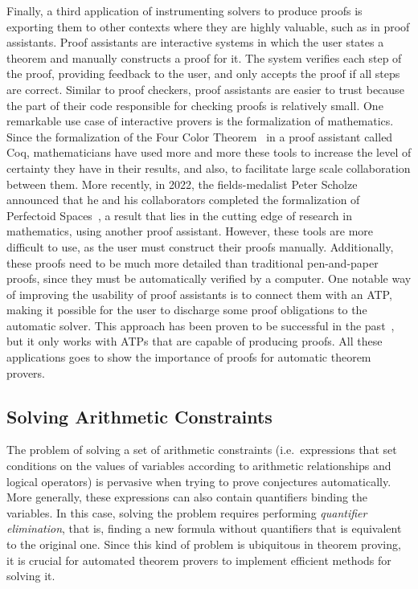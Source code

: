 \documentclass[a4paper, 12pt]{article}
\begin{document}
Finally, a third application of instrumenting solvers to produce proofs is exporting them to
other contexts where they are highly valuable, such as in proof assistants.
%
Proof assistants are interactive systems in which the user states a theorem and manually constructs
a proof for it. The system verifies each step of the proof, providing feedback to the user, and only
accepts the proof if all steps are correct.
%
Similar to proof checkers, proof assistants are easier to trust because the part of their code
responsible for checking proofs is relatively small.
%
One remarkable use case of interactive provers is the formalization of mathematics.
Since the formalization of the Four Color Theorem~\cite{fctCoq} in a proof assistant called Coq,
mathematicians have used more and more these tools to increase the level of certainty
they have in their results, and also, to facilitate large scale collaboration between them.
More recently, in 2022, the fields-medalist Peter Scholze announced that he and his collaborators
completed the formalization of Perfectoid Spaces~\cite{scholze}, a result that lies in the
cutting edge of research in mathematics, using another proof assistant.
%
However, these tools are more difficult to use, as the user must construct their proofs
manually. Additionally, these proofs need to be much more detailed than traditional pen-and-paper proofs,
since they must be automatically verified by a computer.
%
One notable way of improving the usability of proof assistants is to connect them with an ATP,
making it possible for the user to discharge some proof obligations to the automatic solver.
This approach has been proven to be successful in the past~\cite{coq2, reconstruct}, but it
only works with ATPs that are capable of producing proofs.
%
All these applications goes to show the importance of proofs for automatic theorem provers.


\subsection{Solving Arithmetic Constraints}

The problem of solving a set of arithmetic constraints (i.e.\ expressions that set conditions
on the values of variables according to arithmetic relationships and logical operators) is
pervasive when trying to prove conjectures automatically. More generally, these expressions
can also contain quantifiers binding the variables. In this case, solving the problem requires
performing \textit{quantifier elimination}, that is, finding a new formula without quantifiers
that is equivalent to the original one. Since this kind of problem is ubiquitous in theorem
proving, it is crucial for automated theorem provers to implement efficient methods for solving it.
\end{document}
